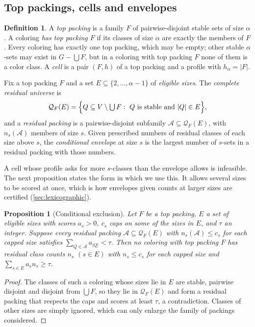 \documentclass[11pt]{article}
\newtheorem{proposition}[theorem]{Proposition}
\theoremstyle{definition}
\newtheorem{definition}[theorem]{Definition}
\newcommand{\Res}{\mathcal{Q}}
\begin{document}
\subsection{Top packings, cells and envelopes}
\label{sec:envelope-defs}

\begin{definition}
\label{def:envelope}
A \emph{top packing} is a family $F$ of pairwise-disjoint stable sets of size
$\alpha$. A coloring \emph{has top packing $F$} if its classes of size
$\alpha$ are exactly the members of $F$. Every coloring has exactly one top
packing, which may be empty; other stable $\alpha$-sets may exist in
$G-\bigcup F$, but in a coloring with top packing $F$ none of them is a color
class. A \emph{cell} is a pair $(F,h)$ of a top packing and a profile with
$h_\alpha=|F|$.

Fix a top packing $F$ and a set $E\subseteq\{2,\ldots,\alpha-1\}$ of
\emph{eligible sizes}. The \emph{complete residual universe} is
\[
  \Res_F(E)=\Bigl\{Q\subseteq V\setminus\textstyle\bigcup F:\
  Q\text{ is stable and }|Q|\in E\Bigr\},
\]
and a \emph{residual packing} is a pairwise-disjoint subfamily
$\mathcal A\subseteq\Res_F(E)$, with $n_s(\mathcal A)$ members of size $s$.
Given prescribed numbers of residual classes of each size above $s$, the
\emph{conditional envelope} at size $s$ is the largest number of $s$-sets in a
residual packing with those numbers.
\end{definition}

A cell whose profile asks for more $s$-classes than the envelope allows is
infeasible. The next proposition states the form in which we use this. It
allows several sizes to be scored at once, which is how envelopes given
counts at larger sizes are certified (\cref{sec:lexicographic}).

\begin{proposition}[Conditional exclusion]
\label{prop:conditional-exclusion}
Let $F$ be a top packing, $E$ a set of eligible sizes with scores $a_s>0$,
$c_s$ caps on some of the sizes in $E$, and $\tau$ an integer. Suppose every
residual packing $\mathcal A\subseteq\Res_F(E)$ with $n_s(\mathcal A)\le c_s$
for each capped size satisfies $\sum_{Q\in\mathcal A}a_{|Q|}<\tau$. Then no
coloring with top packing $F$ has residual class counts $n_s$ $(s\in E)$ with
$n_s\le c_s$ for each capped size and $\sum_{s\in E}a_sn_s\ge\tau$.
\end{proposition}

\begin{proof}
The classes of such a coloring whose sizes lie in $E$ are stable, pairwise
disjoint and disjoint from $\bigcup F$, so they lie in $\Res_F(E)$ and form a
residual packing that respects the caps and scores at least $\tau$, a
contradiction. Classes of other sizes are simply ignored, which can only
enlarge the family of packings considered.
\end{proof}
\end{document}
